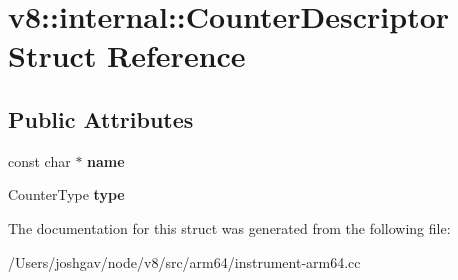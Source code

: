 \hypertarget{structv8_1_1internal_1_1_counter_descriptor}{}\section{v8\+:\+:internal\+:\+:Counter\+Descriptor Struct Reference}
\label{structv8_1_1internal_1_1_counter_descriptor}
\subsection*{Public Attributes}
\begin{DoxyCompactItemize}
\item 
const char $\ast$ {\bfseries name}\hypertarget{structv8_1_1internal_1_1_counter_descriptor_a3959d8bcb4fd672e299a0f8d7e81fc26}{}\label{structv8_1_1internal_1_1_counter_descriptor_a3959d8bcb4fd672e299a0f8d7e81fc26}

\item 
Counter\+Type {\bfseries type}\hypertarget{structv8_1_1internal_1_1_counter_descriptor_a7e83018c112302c8e199e582cb43d901}{}\label{structv8_1_1internal_1_1_counter_descriptor_a7e83018c112302c8e199e582cb43d901}

\end{DoxyCompactItemize}


The documentation for this struct was generated from the following file\+:\begin{DoxyCompactItemize}
\item 
/\+Users/joshgav/node/v8/src/arm64/instrument-\/arm64.\+cc\end{DoxyCompactItemize}
